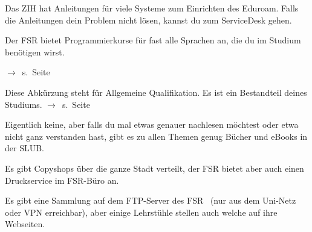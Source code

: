 Das ZIH hat Anleitungen für viele Systeme zum Einrichten des Eduroam. Falls die Anleitungen dein Problem nicht lösen, kannst du zum ServiceDesk gehen.

Der FSR bietet Programmierkurse für fast alle Sprachen an, die du im Studium benötigen wirst. 

\label{minisec:faq}
$\rightarrow$~s.~Seite~\pageref{minisec:faq}

Diese Abkürzung steht für Allgemeine Qualifikation. Es ist ein Bestandteil deines Studiums. $\rightarrow$~s.~Seite~\pageref{lec:aqua}

Eigentlich keine, aber falls du mal etwas genauer nachlesen möchtest oder etwa nicht ganz verstanden hast, gibt es zu allen Themen genug Bücher und eBooks in der SLUB.

Es gibt Copyshops über die ganze Stadt verteilt, der FSR bietet aber auch einen Druckservice im FSR-Büro an.

Es gibt eine Sammlung auf dem FTP-Server des FSR~ (nur aus dem Uni-Netz oder VPN erreichbar), aber einige Lehrstühle stellen auch welche auf ihre Webseiten.
